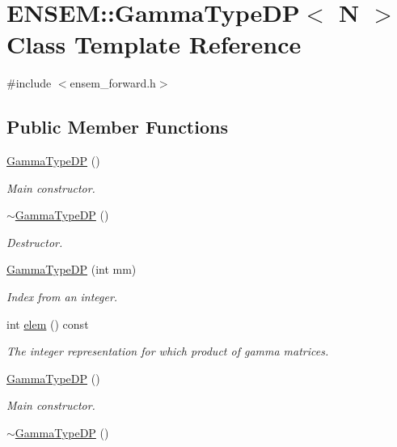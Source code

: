 \hypertarget{classENSEM_1_1GammaTypeDP}{}\section{E\+N\+S\+EM\+:\+:Gamma\+Type\+DP$<$ N $>$ Class Template Reference}
\label{classENSEM_1_1GammaTypeDP}


{\ttfamily \#include $<$ensem\+\_\+forward.\+h$>$}

\subsection*{Public Member Functions}
\begin{DoxyCompactItemize}
\item 
\mbox{\hyperlink{classENSEM_1_1GammaTypeDP_a1833bb262c5e172a0463d853c76c1d18}{Gamma\+Type\+DP}} ()
\begin{DoxyCompactList}\small\item\em Main constructor. \end{DoxyCompactList}\item 
\mbox{\hyperlink{classENSEM_1_1GammaTypeDP_ad0e6f055b87687dac9b7b95e6ec808b0}{$\sim$\+Gamma\+Type\+DP}} ()
\begin{DoxyCompactList}\small\item\em Destructor. \end{DoxyCompactList}\item 
\mbox{\hyperlink{classENSEM_1_1GammaTypeDP_a6a31946a6e7bde24f7bae87f6cfd2add}{Gamma\+Type\+DP}} (int mm)
\begin{DoxyCompactList}\small\item\em Index from an integer. \end{DoxyCompactList}\item 
int \mbox{\hyperlink{classENSEM_1_1GammaTypeDP_a0d7ad0581feda4578c3ee7631ce730e2}{elem}} () const
\begin{DoxyCompactList}\small\item\em The integer representation for which product of gamma matrices. \end{DoxyCompactList}\item 
\mbox{\hyperlink{classENSEM_1_1GammaTypeDP_a1833bb262c5e172a0463d853c76c1d18}{Gamma\+Type\+DP}} ()
\begin{DoxyCompactList}\small\item\em Main constructor. \end{DoxyCompactList}\item 
\mbox{\hyperlink{classENSEM_1_1GammaTypeDP_ad0e6f055b87687dac9b7b95e6ec808b0}{$\sim$\+Gamma\+Type\+DP}} ()

\end{DoxyCompactItemize}
